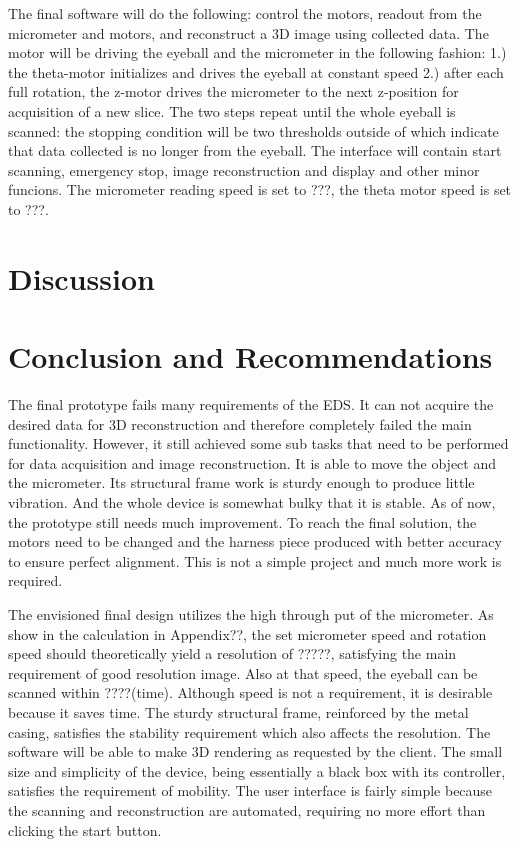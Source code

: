 \documentclass{article}
\begin{document}
The final software will do the following: control the motors, readout from the micrometer and motors, and 
reconstruct a 3D image using collected data. The motor will be driving the eyeball and the micrometer in 
the following fashion: 1.) the theta-motor initializes and drives the eyeball at constant speed 2.) after each 
full rotation, the z-motor drives the micrometer to the next z-position for acquisition of a new slice. The two 
steps repeat until the whole eyeball is scanned: the stopping condition will be two thresholds outside of 
which indicate that data collected is no longer from the eyeball. The interface will contain start scanning, emergency stop, image reconstruction and display and other minor funcions. The micrometer reading speed is set to ???, the theta motor speed is set to ???.



\section{Discussion}
\label{sec:discussion}

\section{Conclusion and Recommendations}
\label{sec:concl-recomm}

The final prototype fails many requirements of the EDS. It can not acquire the desired data for 3D 
reconstruction and therefore completely failed the main functionality. However, it still achieved some sub 
tasks that need to be performed for data acquisition and image reconstruction. It is able to move the object 
and the micrometer. Its structural frame work is sturdy enough to produce little vibration. And the whole 
device is somewhat bulky that it is stable. As of now, the prototype still needs much improvement. To 
reach the final solution, the motors need to be changed and the harness piece produced with better 
accuracy to ensure perfect alignment. This is not a simple project and much more work is required.

The envisioned final design utilizes the high through put of the micrometer. As show in the calculation in 
Appendix??, the set micrometer speed and rotation speed should theoretically yield a resolution of ?????, 
satisfying the main requirement of good resolution image. Also at that speed, the eyeball can be scanned 
within ????(time). Although speed is not a requirement, it is desirable because it saves time. The sturdy 
structural frame, reinforced by the metal casing, satisfies the stability requirement which also affects the 
resolution. The software will be able to make 3D rendering as requested by the client. The small size and 
simplicity of the device, being essentially a black box with its controller, satisfies the requirement of 
mobility. The user interface is fairly simple because the scanning and reconstruction are automated, 
requiring no more effort than clicking the start button. 
\end{document}
